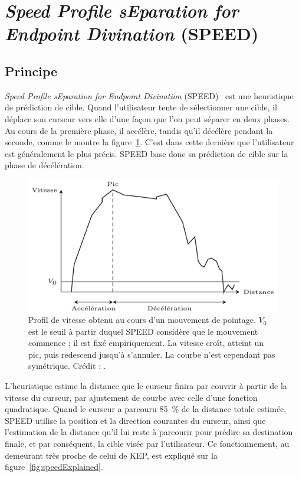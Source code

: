 \section{\emph{Speed Profile sEparation for Endpoint Divination} (SPEED)}
	\subsection{Principe}
	\emph{Speed Profile sEparation for Endpoint Divination} (SPEED)~\cite{wonner2011speed} est une heuristique de prédiction de cible. Quand l'utilisateur tente de sélectionner une cible, il déplace son curseur vers elle d'une façon que l'on peut séparer en deux phases. Au cours de la première phase, il accélère, tandis qu'il décélère pendant la seconde, comme le montre la figure~\ref{fig:speedProfile}. C'est dans cette dernière que l'utilisateur est généralement le plus précis. SPEED base donc sa prédiction de cible sur la phase de décélération.
	
	\begin{figure}[H]
		\centering
		\includegraphics[width=\textwidth]{figures/ch2/speedProfile}
		\caption[Profil de vitesse obtenu au cours d'un mouvement de pointage]{Profil de vitesse obtenu au cours d'un mouvement de pointage. $V_{0}$ est le seuil à partir duquel SPEED considère que le mouvement commence ; il est fixé empiriquement. La vitesse croît, atteint un pic, puis redescend jusqu'à s'annuler. La courbe n'est cependant pas symétrique. Crédit : \cite{wonner2011speed}.}
		\label{fig:speedProfile}
	\end{figure}
	
	L'heuristique estime la distance que le curseur finira par couvrir à partir de la vitesse du curseur, par ajustement de courbe avec celle d'une fonction quadratique. Quand le curseur a parcouru 85~\%{} de la distance totale estimée, SPEED utilise la position et la direction courantes du curseur, ainsi que l'estimation de la distance qu'il lui reste à parcourir pour prédire sa destination finale, et par conséquent, la cible visée par l'utilisateur. Ce fonctionnement, au demeurant très proche de celui de KEP, est expliqué sur la figure~\ref{fig:speedExplained}.
	
